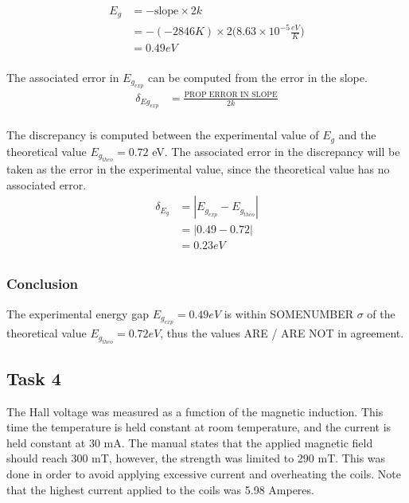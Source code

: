 \documentclass[a4paper]{article}
\begin{document}
\begin{align*}
E_g &= - \text{slope} \times 2k \\
    &= - (-2846 K) \times 2 
       \Big( 8.63 \times 10^{-5} \frac{eV}{K} \Big) \\
    &= 0.49 eV \\
\end{align*}

The associated error in $E_{g_{exp}}$ can be computed from the error in the slope.
\begin{align*}
\delta_{Eg_{exp}} &= \frac{\text{PROP ERROR IN SLOPE}}{2k} \\
		
\end{align*}

\qq The discrepancy is computed between the experimental value of
$E_g$ and the theoretical value $E_{g_{theo}} = 0.72$ eV. The
associated error in the discrepancy will be taken as the error in the
experimental value, since the theoretical value has no associated
error.
\begin{align*}
\delta_{E_g} &= | E_{g_{exp}} - E_{g_{theo}} | \\
		     &= | 0.49 - 0.72 | \\
		     &= 0.23 eV \\
\end{align*}

\subsubsection{Conclusion}
\qq The experimental energy gap $E_{g_{exp}} = 0.49 eV$ is within
SOMENUMBER $\sigma$ of the theoretical value $E_{g_{theo}} = 0.72 eV$,
thus the values ARE / ARE NOT in agreement.

\subsection{Task 4}

\qq The Hall voltage was measured as a function of the magnetic
induction. This time the temperature is held constant at room
temperature, and the current is held constant at 30 mA. The manual
states that the applied magnetic field should reach 300 mT,
however, the strength was limited to 290 mT. This was done in
order to avoid applying excessive current and overheating the coils. 
Note that the highest current applied to the coils was 5.98
Amperes.
\end{document}
